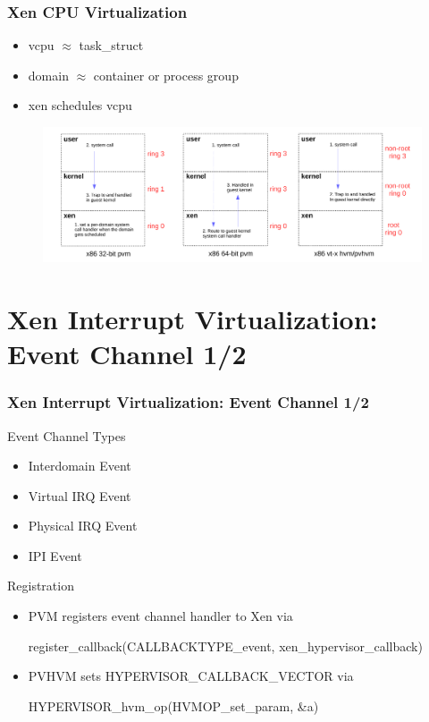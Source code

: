 \documentclass[aspectratio=169]{beamer}
\begin{document}
\begin{frame}
\frametitle{Xen CPU Virtualization}
\begin{itemize}
\item vcpu $ \approx $ task\_struct
\item domain $ \approx $ container or process group
\item xen schedules vcpu
\end{itemize}
\begin{figure}
\includegraphics[width=1.0\linewidth]{figures/cpu.pdf}
\end{figure}
\end{frame}


\section{Xen Interrupt Virtualization: Event Channel 1/2}
\begin{frame}
\frametitle{Xen Interrupt Virtualization: Event Channel 1/2}
\begin{block}{Event Channel Types}
\begin{itemize}
\item Interdomain Event
\item Virtual IRQ Event
\item Physical IRQ Event
\item IPI Event
\end{itemize}
\end{block}
\begin{block}{Registration}
\begin{itemize}
\item PVM registers event channel handler to Xen via 

register\_callback(CALLBACKTYPE\_event, xen\_hypervisor\_callback)

\item PVHVM sets HYPERVISOR\_CALLBACK\_VECTOR via

HYPERVISOR\_hvm\_op(HVMOP\_set\_param, \&a)
\end{itemize}
\end{block}

\end{frame}
\end{document}
